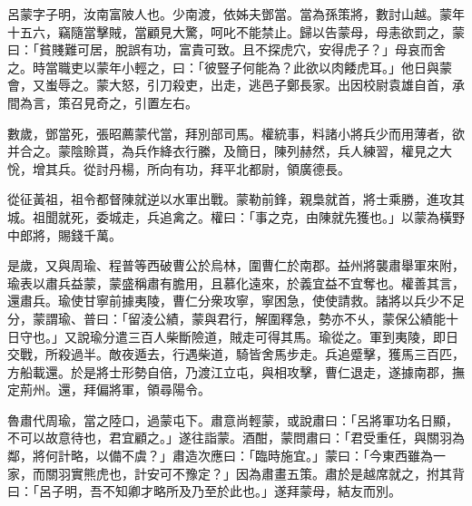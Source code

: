 \begin{pinyinscope}
 
 
 呂蒙字子明，汝南富陂人也。少南渡，依姊夫鄧當。當為孫策將，數討山越。蒙年十五六，竊隨當擊賊，當顧見大驚，呵叱不能禁止。歸以告蒙母，母恚欲罰之，蒙曰：「貧賤難可居，脫誤有功，富貴可致。且不探虎穴，安得虎子？」母哀而舍之。時當職吏以蒙年小輕之，曰：「彼豎子何能為？此欲以肉餧虎耳。」他日與蒙會，又蚩辱之。蒙大怒，引刀殺吏，出走，逃邑子鄭長家。出因校尉袁雄自首，承間為言，策召見奇之，引置左右。
 
 
 
 
 數歲，鄧當死，張昭薦蒙代當，拜別部司馬。權統事，料諸小將兵少而用薄者，欲并合之。蒙陰賒貰，為兵作絳衣行縢，及簡日，陳列赫然，兵人練習，權見之大恱，增其兵。從討丹楊，所向有功，拜平北都尉，領廣德長。
 
 
 
 
 從征黃祖，祖令都督陳就逆以水軍出戰。蒙勒前鋒，親梟就首，將士乘勝，進攻其城。祖聞就死，委城走，兵追禽之。權曰：「事之克，由陳就先獲也。」以蒙為橫野中郎將，賜錢千萬。
 
 
 
 
 是歲，又與周瑜、程普等西破曹公於烏林，圍曹仁於南郡。益州將襲肅舉軍來附，瑜表以肅兵益蒙，蒙盛稱肅有膽用，且慕化遠來，於義宜益不宜奪也。權善其言，還肅兵。瑜使甘寧前據夷陵，曹仁分衆攻寧，寧困急，使使請救。諸將以兵少不足分，蒙謂瑜、普曰：「留淩公績，蒙與君行，解圍釋急，勢亦不乆，蒙保公績能十日守也。」又說瑜分遣三百人柴斷險道，賊走可得其馬。瑜從之。軍到夷陵，即日交戰，所殺過半。敵夜遁去，行遇柴道，騎皆舍馬步走。兵追蹙擊，獲馬三百匹，方船載還。於是將士形勢自倍，乃渡江立屯，與相攻擊，曹仁退走，遂據南郡，撫定荊州。還，拜偏將軍，領尋陽令。
 
 
 
 
 魯肅代周瑜，當之陸口，過蒙屯下。肅意尚輕蒙，或說肅曰：「呂將軍功名日顯，不可以故意待也，君宜顧之。」遂往詣蒙。酒酣，蒙問肅曰：「君受重任，與關羽為鄰，將何計略，以備不虞？」肅造次應曰：「臨時施宜。」蒙曰：「今東西雖為一家，而關羽實熊虎也，計安可不豫定？」因為肅畫五策。肅於是越席就之，拊其背曰：「呂子明，吾不知卿才略所及乃至於此也。」遂拜蒙母，結友而別。
 
 
 

\end{pinyinscope}
